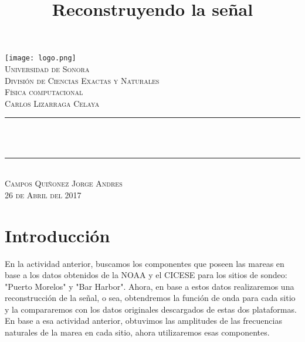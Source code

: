 \documentclass{article}
\title{Reconstruyendo la señal}
\makeatletter
\let\thetitle\@title
\makeatother
\begin{document}
\begin{titlepage}
\centering
  \vspace*{0.5 cm}
   \texttt{[image: logo.png]}\\[0.5 cm]%
    \textsc{\LARGE Universidad de Sonora}\\[1.0 cm]	%
	\textsc{\LARGE División de Ciencias Exactas y Naturales}\\[0.5 cm]	
    
	\textsc{\LARGE Física computacional}\\
    \textsc{\Large Carlos Lizarraga Celaya}\\ [0.5 cm]
    \rule{\linewidth}{0.2 mm} \\[0.4 cm]
	{ \huge \bfseries \thetitle}\\
	\rule{\linewidth}{0.2 mm} \\[0.5 cm]
    \textsc{\Large Campos Quiñonez Jorge Andres} \\[0.25 cm]
   \textsc {\large 26 de Abril del 2017} 	

	
 
	\vfill
	
\end{titlepage}
\pagebreak

\newpage

\pagebreak

\pagebreak
\onehalfspacing

\section*{\LARGE Introducción}
\large En la actividad anterior, buscamos los componentes que poseen las mareas en base a los datos obtenidos de la NOAA y el CICESE para los sitios de sondeo: "Puerto Morelos" y "Bar Harbor". Ahora, en base a estos datos realizaremos una reconstrucción de la señal, o sea, obtendremos la función de onda para cada sitio y la compararemos con los datos originales descargados de estas dos plataformas. En base a esa actividad anterior, obtuvimos las amplitudes de las frecuencias naturales de la marea en cada sitio, ahora utilizaremos esas componentes.
\end{document}
